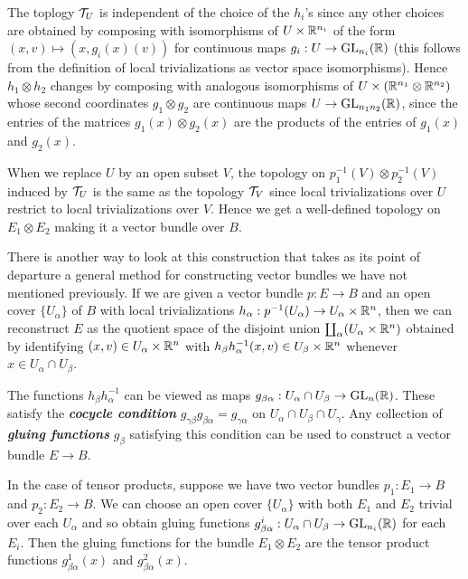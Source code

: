\begin{defn}
\begin{itemize}
		The toplogy $\mathcal{T}_U$ is independent of the choice of the $h_i$'s since any other choices are obtained by composing with isomorphisms of $U\times\mathbb{R}^{n_i}$ of the form $(x,v)\mapsto(x,g_i(x)(v))$ for continuous maps $g_i:U\to \operatorname{GL}_{n_i}(\mathbb{R})$ {\color{cyan}(this follows from the definition of local trivializations as vector space isomorphisms)}. Hence $h_1\otimes h_2$ changes by composing with analogous isomorphisms of $U\times (\mathbb{R}^{n_1}\otimes\mathbb{R}^{n_2})$ whose second coordinates $g_1\otimes g_2$ are continuous maps $U\to\operatorname{GL}_{n_1n_2}(\mathbb{R})$, since the entries of the matrices $g_1(x)\otimes g_2(x)$ are the products of the entries of $g_1(x)$ and $g_2(x)$.
		
		When we replace $U$ by an open subset $V$, the topology on $p_1^{-1}(V)\otimes p_2^{-1}(V)$ induced by $\mathcal{T}_U$ is the same as the topology $\mathcal{T}_V$ since local trivializations over $U$ restrict to local trivializations over $V$. Hence we get a well-defined topology on $E_1\otimes E_2$ making it a vector bundle over $B$.
	\end{itemize}
\end{defn}
\begin{remark}
	There is another way to look at this construction that takes as its point of departure a general method for constructing vector bundles we have not mentioned previously. If we are given a vector bundle $p:E\to B$ and an open cover $\{U_\alpha\}$ of $B$ with local trivializations $h_\alpha:p^{-1}(U_\alpha)\to U_\alpha\times\mathbb{R}^n$, then we can reconstruct $E$ as the quotient space of the disjoint union $\coprod_\alpha(U_\alpha\times\mathbb{R}^n)$ obtained by identifying $(x,v)\in U_\alpha\times\mathbb{R}^n$ with $h_\beta h_\alpha^{-1}(x,v)\in U_\beta\times\mathbb{R}^n$ whenever $x\in U_\alpha\cap U_\beta$.
	
	The functions $h_\beta h_\alpha^{-1}$ can be viewed as maps $g_{\beta\alpha}:U_\alpha\cap U_\beta\to \operatorname{GL}_n(\mathbb{R})$. These satisfy the \textbf{\textit{cocycle condition}}\label{cocycle-condition} $g_{\gamma\beta}g_{\beta\alpha}=g_{\gamma\alpha}$ on $U_\alpha\cap U_\beta\cap U_\gamma$. Any collection of \textbf{\textit{gluing functions}} $g_{\beta}$ satisfying this condition can be used to construct a vector bundle $E\to B$.
	
	In the case of tensor products, suppose we have two vector bundles $p_1:E_1\to B$ and $p_2:E_2\to B$. We can choose an open cover $\{U_\alpha\}$ with both $E_1$ and $E_2$ trivial over each $U_\alpha$ and so obtain gluing functions $g_{\beta\alpha}^i:U_\alpha\cap U_\beta\to\operatorname{GL}_{n_i}(\mathbb{R})$ for each $E_i$. Then the gluing functions for the bundle $E_1\otimes E_2$ are the tensor product functions $g_{\beta\alpha}^1(x)$ and $g_{\beta\alpha}^2(x)$.
\end{remark}
